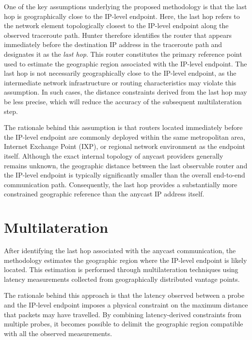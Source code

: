 One of the key assumptions underlying the proposed methodology is that the last hop is geographically close to the IP-level endpoint. Here, the last hop refers to the network element topologically closest to the IP-level endpoint along the observed traceroute path. Hunter therefore identifies the router that appears immediately before the destination IP address in the traceroute path and designates it as the \textit{last hop}. This router constitutes the primary reference point used to estimate the geographic region associated with the IP-level endpoint. The last hop is not necessarily geographically close to the IP-level endpoint, as the intermediate network infrastructure or routing characteristics may violate this assumption. In such cases, the distance constraints derived from the last hop may be less precise, which will reduce the accuracy of the subsequent multilateration step.

The rationale behind this assumption is that routers located immediately before the IP-level endpoint are commonly deployed within the same metropolitan area, Internet Exchange Point (IXP), or regional network environment as the endpoint itself. Although the exact internal topology of anycast providers generally remains unknown, the geographic distance between the last observable router and the IP-level endpoint is typically significantly smaller than the overall end-to-end communication path. Consequently, the last hop provides a substantially more constrained geographic reference than the anycast IP address itself.

\section{Multilateration}
\label{sc:hunter_multilateration}

After identifying the last hop associated with the anycast communication, the methodology estimates the geographic region where the IP-level endpoint is likely located. This estimation is performed through multilateration techniques using latency measurements collected from geographically distributed vantage points.

The rationale behind this approach is that the latency observed between a probe and the IP-level endpoint imposes a physical constraint on the maximum distance that packets may have travelled. By combining latency-derived constraints from multiple probes, it becomes possible to delimit the geographic region compatible with all the observed measurements\cite{Cicalese2016Latency-BasedSets}.

